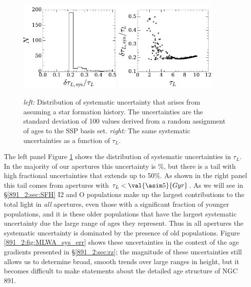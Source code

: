 \begin{figure}
  \centering
  \includegraphics[width=0.45\textwidth]{891_2/figs/sys_uncertainty_hist.pdf}
  \includegraphics[width=0.45\textwidth]{891_2/figs/sys_uncertainty.pdf}
  \caption[Distribution of systematic uncertainties in
    $\tau_L$]{\fixspacing\label{891_2:fig:sys_err}\emph{left:}
    Distribution of systematic uncertainty that arises from assuming a
    star formation history. The uncertainties are the standard
    deviation of 100 values derived from a random assignment of ages
    to the SSP basis set. \emph{right:} The same systematic
    uncertainties as a function of $\tau_L$.}
\end{figure}

The left panel Figure \ref{891_2:fig:sys_err} shows the distribution
of systematic uncertainties in $\tau_L$. In the majority of our
apertures this uncertainty is \%, but there is a tail with
high fractional uncertainties that extends up to 50\%. As shown in the
right panel this tail comes from apertures with $\tau_L < \val{\asim
  5}{Gyr}$. As we will see in \S\ref{891_2:sec:SFH} I2 and O
populations make up the largest contributions to the total light in
\emph{all} apertures, even those with a significant fraction of
younger populations, and it is these older populations that have the
largest systematic uncertainty due the large range of ages they
represent. Thus in all apertures the systematic uncertainty is
dominated by the presence of old populations. Figure
\ref{891_2:fig:MLWA_sys_err} shows these uncertainties in the context
of the age gradients presented in \S\ref{891_2:sec:rz}; the magnitude
of these uncertainties still allows us to determine broad, smooth
trends over large ranges in height, but it becomes difficult to make
statements about the detailed age structure of NGC 891.

